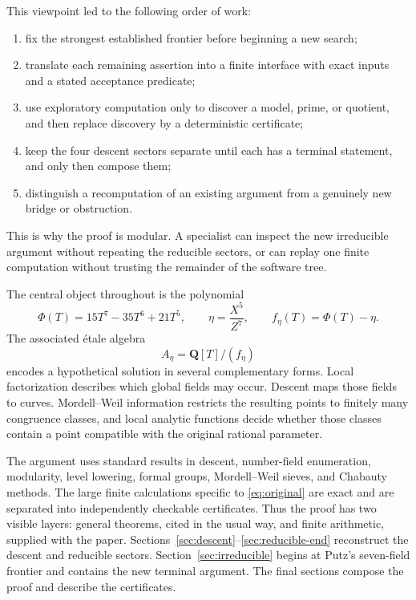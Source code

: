 \documentclass[11pt]{article}
\newcommand{\Q}{\mathbf Q}
\theoremstyle{definition}
\theoremstyle{remark}
\begin{document}
This viewpoint led to the following order of work:
\begin{enumerate}[leftmargin=2.2em]
\item fix the strongest established frontier before beginning a new search;
\item translate each remaining assertion into a finite interface with exact
inputs and a stated acceptance predicate;
\item use exploratory computation only to discover a model, prime, or
quotient, and then replace discovery by a deterministic certificate;
\item keep the four descent sectors separate until each has a terminal
statement, and only then compose them;
\item distinguish a recomputation of an existing argument from a genuinely
new bridge or obstruction.
\end{enumerate}
This is why the proof is modular.  A specialist can inspect the new
irreducible argument without repeating the reducible sectors, or can replay
one finite computation without trusting the remainder of the software tree.

The central object throughout is the polynomial
\begin{equation}\label{eq:phi}
 \Phi(T)=15T^7-35T^6+21T^5,
 \qquad \eta=\frac{X^5}{Z^7},
 \qquad f_\eta(T)=\Phi(T)-\eta.
\end{equation}
The associated \'etale algebra
\[
                         A_\eta=\Q[T]/(f_\eta)
\]
encodes a hypothetical solution in several complementary forms.  Local
factorization describes which global fields may occur.  Descent maps those
fields to curves.  Mordell--Weil information restricts the resulting points
to finitely many congruence classes, and local analytic functions decide
whether those classes contain a point compatible with the original rational
parameter.

The argument uses standard results in descent, number-field
enumeration, modularity, level lowering, formal groups, Mordell--Weil sieves,
and Chabauty methods.  The large finite calculations specific to
\eqref{eq:original} are exact and are separated into independently
checkable certificates.  Thus the proof has two visible layers: general
theorems, cited in the usual way, and finite arithmetic, supplied with the
paper.  Sections~\ref{sec:descent}--\ref{sec:reducible-end} reconstruct the
descent and reducible sectors.  Section~\ref{sec:irreducible} begins at
Putz's seven-field frontier and contains the new terminal argument.  The
final sections compose the proof and describe the certificates.
\end{document}
